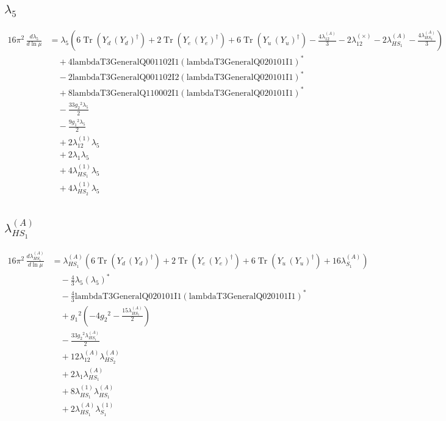 \documentclass[10pt,a4paper]{article}
\begin{document}
\subsection*{$\lambda_5$}
\begin{align*}
16\pi^2\,\frac{d \lambda_5}{d\ln\mu} &={\lambda_5} \left(6 \operatorname{Tr}\!\left({Y_d}\,\left({Y_d}\right)^{\dagger}\right)+2 \operatorname{Tr}\!\left({Y_e}\,\left({Y_e}\right)^{\dagger}\right)+6 \operatorname{Tr}\!\left({Y_u}\,\left({Y_u}\right)^{\dagger}\right)-\frac{4 {\lambda_{12}^{(A)}}}{3}-2 {\lambda_{12}^{(\times)}}-2 {\lambda_{HS_1}^{(A)}}-\frac{4 {\lambda_{HS_2}^{(A)}}}{3}\right) \\
&\quad +4 \text{lambdaT3GeneralQ001102I1} \left(\text{lambdaT3GeneralQ020101I1}\right)^{*} \\
&\quad -2 \text{lambdaT3GeneralQ001102I2} \left(\text{lambdaT3GeneralQ020101I1}\right)^{*} \\
&\quad +8 \text{lambdaT3GeneralQ110002I1} \left(\text{lambdaT3GeneralQ020101I1}\right)^{*} \\
&\quad -\frac{33 {g_2}^2 {\lambda_5}}{2} \\
&\quad -\frac{9 {g_1}^2 {\lambda_5}}{2} \\
&\quad +2 {\lambda_{12}^{(1)}} {\lambda_5} \\
&\quad +2 {\lambda_1} {\lambda_5} \\
&\quad +4 {\lambda_{HS_1}^{(1)}} {\lambda_5} \\
&\quad +4 {\lambda_{HS_2}^{(1)}} {\lambda_5} \\
\end{align*}
\subsection*{$\lambda_{HS_1}^{(A)}$}
\begin{align*}
16\pi^2\,\frac{d \lambda_{HS_1}^{(A)}}{d\ln\mu} &={\lambda_{HS_1}^{(A)}} (6 \operatorname{Tr}\!\left({Y_d}\,\left({Y_d}\right)^{\dagger}\right)+2 \operatorname{Tr}\!\left({Y_e}\,\left({Y_e}\right)^{\dagger}\right)+6 \operatorname{Tr}\!\left({Y_u}\,\left({Y_u}\right)^{\dagger}\right)+16 {\lambda_{S_1}^{(A)}}) \\
&\quad -\frac{4}{3} {\lambda_5} \left({\lambda_5}\right)^{*} \\
&\quad -\frac{4}{3} \text{lambdaT3GeneralQ020101I1} \left(\text{lambdaT3GeneralQ020101I1}\right)^{*} \\
&\quad +{g_1}^2 \left(-4 {g_2}^2-\frac{15 {\lambda_{HS_1}^{(A)}}}{2}\right) \\
&\quad -\frac{33 {g_2}^2 {\lambda_{HS_1}^{(A)}}}{2} \\
&\quad +12 {\lambda_{12}^{(A)}} {\lambda_{HS_2}^{(A)}} \\
&\quad +2 {\lambda_1} {\lambda_{HS_1}^{(A)}} \\
&\quad +8 {\lambda_{HS_1}^{(1)}} {\lambda_{HS_1}^{(A)}} \\
&\quad +2 {\lambda_{HS_1}^{(A)}} {\lambda_{S_1}^{(1)}} \\
\end{align*}
\end{document}
